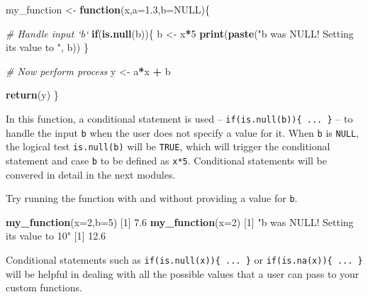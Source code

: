 \documentclass[
]{book}
\newenvironment{Shaded}{\begin{snugshade}}{\end{snugshade}}
\newcommand{\CommentTok}[1]{\textcolor[rgb]{0.56,0.35,0.01}{\textit{#1}}}
\newcommand{\ControlFlowTok}[1]{\textcolor[rgb]{0.13,0.29,0.53}{\textbf{#1}}}
\newcommand{\DataTypeTok}[1]{\textcolor[rgb]{0.13,0.29,0.53}{#1}}
\newcommand{\DecValTok}[1]{\textcolor[rgb]{0.00,0.00,0.81}{#1}}
\newcommand{\FloatTok}[1]{\textcolor[rgb]{0.00,0.00,0.81}{#1}}
\newcommand{\KeywordTok}[1]{\textcolor[rgb]{0.13,0.29,0.53}{\textbf{#1}}}
\newcommand{\NormalTok}[1]{#1}
\newcommand{\OperatorTok}[1]{\textcolor[rgb]{0.81,0.36,0.00}{\textbf{#1}}}
\newcommand{\OtherTok}[1]{\textcolor[rgb]{0.56,0.35,0.01}{#1}}
\newcommand{\StringTok}[1]{\textcolor[rgb]{0.31,0.60,0.02}{#1}}
\begin{document}
\begin{Shaded}
\begin{Highlighting}[]
\NormalTok{my_function <-}\StringTok{ }\ControlFlowTok{function}\NormalTok{(x,}\DataTypeTok{a=}\FloatTok{1.3}\NormalTok{,}\DataTypeTok{b=}\OtherTok{NULL}\NormalTok{)\{}
  
  \CommentTok{# Handle input `b`}
  \ControlFlowTok{if}\NormalTok{(}\KeywordTok{is.null}\NormalTok{(b))\{}
\NormalTok{    b <-}\StringTok{ }\NormalTok{x}\OperatorTok{*}\DecValTok{5}
    \KeywordTok{print}\NormalTok{(}\KeywordTok{paste}\NormalTok{(}\StringTok{"b was NULL! Setting its value to "}\NormalTok{, b))}
\NormalTok{  \}}
  
  \CommentTok{# Now perform process}
\NormalTok{  y <-}\StringTok{ }\NormalTok{a}\OperatorTok{*}\NormalTok{x }\OperatorTok{+}\StringTok{ }\NormalTok{b}
  
  \KeywordTok{return}\NormalTok{(y)}
\NormalTok{\}}
\end{Highlighting}
\end{Shaded}

In this function, a conditional statement is used -- \texttt{if(is.null(b))\{\ ...\ \}} -- to handle the input \texttt{b} when the user does not specify a value for it. When \texttt{b} is \texttt{NULL}, the logical test \texttt{is.null(b)} will be \texttt{TRUE}, which will trigger the conditional statement and case \texttt{b} to be defined as \texttt{x*5}. Conditional statements will be convered in detail in the next modules.

Try running the function with and without providing a value for \texttt{b}.

\begin{Shaded}
\begin{Highlighting}[]
\KeywordTok{my_function}\NormalTok{(}\DataTypeTok{x=}\DecValTok{2}\NormalTok{,}\DataTypeTok{b=}\DecValTok{5}\NormalTok{)}
\NormalTok{[}\DecValTok{1}\NormalTok{] }\FloatTok{7.6}
\KeywordTok{my_function}\NormalTok{(}\DataTypeTok{x=}\DecValTok{2}\NormalTok{)}
\NormalTok{[}\DecValTok{1}\NormalTok{] }\StringTok{"b was NULL! Setting its value to  10"}
\NormalTok{[}\DecValTok{1}\NormalTok{] }\FloatTok{12.6}
\end{Highlighting}
\end{Shaded}

Conditional statements such as \texttt{if(is.null(x))\{\ ...\ \}} or \texttt{if(is.na(x))\{\ ...\ \}} will be helpful in dealing with all the possible values that a user can pass to your custom functions.
\end{document}
